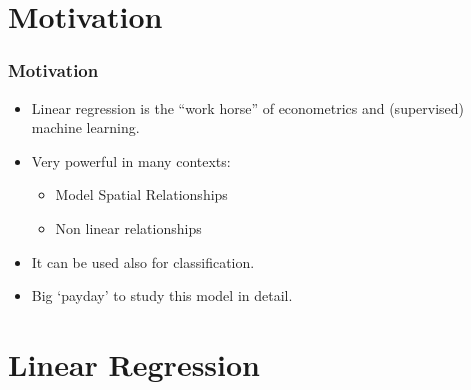 \documentclass[
  shownotes,
  xcolor={svgnames},
  hyperref={colorlinks,citecolor=DarkBlue,linkcolor=DarkRed,urlcolor=DarkBlue}
  ]{beamer}
\begin{document}
\section{Motivation}
\begin{frame}
\frametitle{Motivation}

\begin{itemize}
  \item Linear regression is the “work horse” of econometrics and (supervised) machine learning. 
  \bigskip
  \item Very powerful in many contexts:
  \bigskip
  \begin{itemize}
    \item Model Spatial Relationships
    \item Non linear relationships
  \end{itemize}
  \bigskip
  \item It can be used also for classification. 
  \bigskip
  \item Big `payday' to study this model in detail.
\end{itemize}
\end{frame}

\section{Linear Regression}
\end{document}
